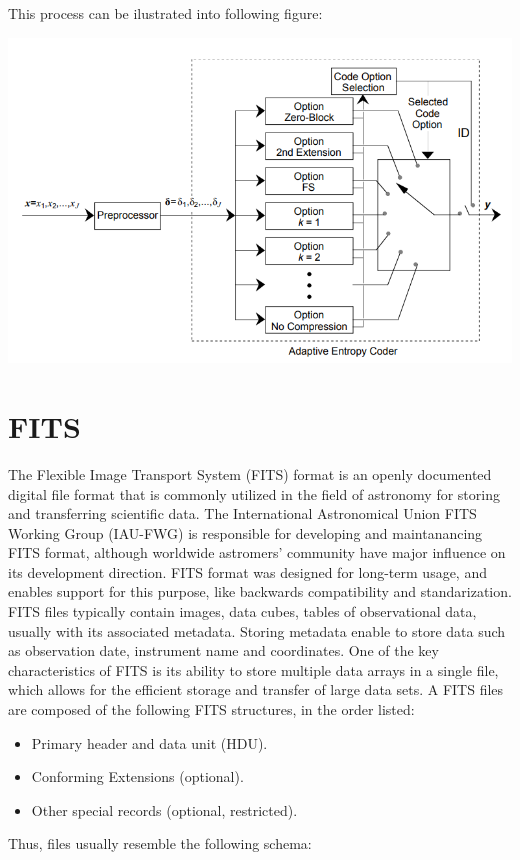 \documentclass[licencjacka,en]{pracamgr}
\begin{document}
\hfill \break
\hfill \break
\hfill \break
\hfill \break
This process can be ilustrated into following figure:
\hfill \break
\hfill \break
\centerline{\includegraphics[scale=1.05]{RICE_encoder_architecture}}

\section{FITS}
The Flexible Image Transport System (FITS) format is an openly documented digital file format that is commonly
utilized in the field of astronomy for storing and transferring scientific data. The International Astronomical Union FITS Working Group (IAU-FWG) is responsible for developing and maintanancing FITS format, although worldwide astromers' community have major influence on its development direction. FITS format was designed for long-term usage, and enables support for this purpose, like backwards compatibility and standarization. FITS files
typically contain images, data cubes, tables of observational data, usually with its associated metadata. Storing metadata enable to store data such as observation date, instrument name and coordinates.
One of the key characteristics of FITS is its ability to store multiple data arrays in a single file, which
allows for the efficient storage and transfer of large data sets.
A FITS files are composed of the following FITS structures, in the order listed:
\begin{itemize}
	\item Primary header and data unit (HDU).
	\item Conforming Extensions (optional).
	\item Other special records (optional, restricted).
\end{itemize}
Thus, files usually resemble the following schema:
\hfill \break
\hfill \break
\end{document}
